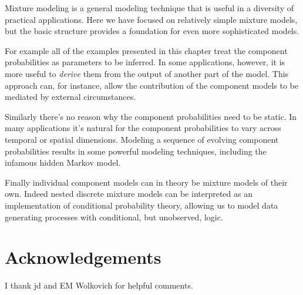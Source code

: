 \documentclass[
  letterpaper,
  DIV=11,
  numbers=noendperiod]{scrartcl}
\begin{document}
Mixture modeling is a general modeling technique that is useful in a
diversity of practical applications. Here we have focused on relatively
simple mixture models, but the basic structure provides a foundation for
even more sophisticated models.

For example all of the examples presented in this chapter treat the
component probabilities as parameters to be inferred. In some
applications, however, it is more useful to \emph{derive} them from the
output of another part of the model. This approach can, for instance,
allow the contribution of the component models to be mediated by
external circumstances.

Similarly there's no reason why the component probabilities need to be
static. In many applications it's natural for the component
probabilities to vary across temporal or spatial dimensions. Modeling a
sequence of evolving component probabilities results in some powerful
modeling techniques, including the infamous hidden Markov model.

Finally individual component models can in theory be mixture models of
their own. Indeed nested discrete mixture models can be interpreted as
an implementation of conditional probability theory, allowing us to
model data generating processes with conditional, but unobserved, logic.

\section*{Acknowledgements}\label{acknowledgements}

I thank jd and EM Wolkovich for helpful comments.
\end{document}
